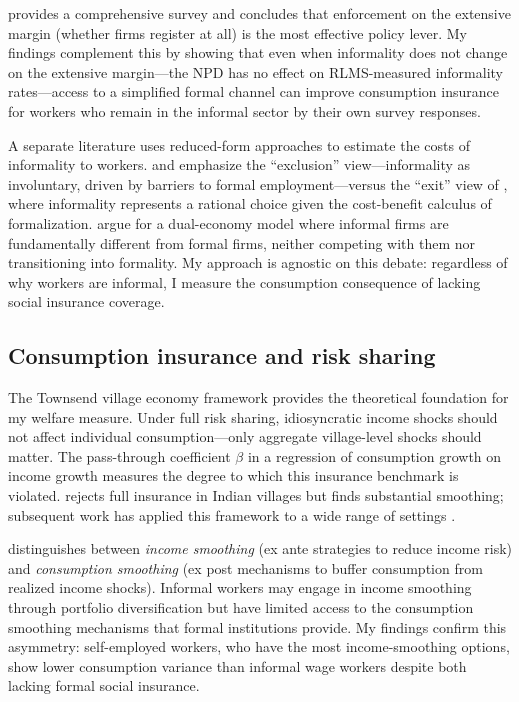 \documentclass[12pt]{article}
\begin{document}
\citet{Ulyssea2020} provides a comprehensive survey and concludes that enforcement on the extensive margin (whether firms register at all) is the most effective policy lever. My findings complement this by showing that even when informality does not change on the extensive margin---the NPD has no effect on RLMS-measured informality rates---access to a simplified formal channel can improve consumption insurance for workers who remain in the informal sector by their own survey responses.

A separate literature uses reduced-form approaches to estimate the costs of informality to workers. \citet{Perry2007} and \citet{Levy2008} emphasize the ``exclusion'' view---informality as involuntary, driven by barriers to formal employment---versus the ``exit'' view of \citet{Maloney2004}, where informality represents a rational choice given the cost-benefit calculus of formalization. \citet{LaPortaShleifer2014} argue for a dual-economy model where informal firms are fundamentally different from formal firms, neither competing with them nor transitioning into formality. My approach is agnostic on this debate: regardless of why workers are informal, I measure the consumption consequence of lacking social insurance coverage.

\subsection{Consumption insurance and risk sharing}

The Townsend village economy framework \citep{Townsend1994} provides the theoretical foundation for my welfare measure. Under full risk sharing, idiosyncratic income shocks should not affect individual consumption---only aggregate village-level shocks should matter. The pass-through coefficient $\beta$ in a regression of consumption growth on income growth measures the degree to which this insurance benchmark is violated. \citet{Townsend1994} rejects full insurance in Indian villages but finds substantial smoothing; subsequent work has applied this framework to a wide range of settings \citep{Cochrane1991, Mace1991, Attanasio2002}.

\citet{Morduch1995} distinguishes between \textit{income smoothing} (ex ante strategies to reduce income risk) and \textit{consumption smoothing} (ex post mechanisms to buffer consumption from realized income shocks). Informal workers may engage in income smoothing through portfolio diversification but have limited access to the consumption smoothing mechanisms that formal institutions provide. My findings confirm this asymmetry: self-employed workers, who have the most income-smoothing options, show lower consumption variance than informal wage workers despite both lacking formal social insurance.
\end{document}
